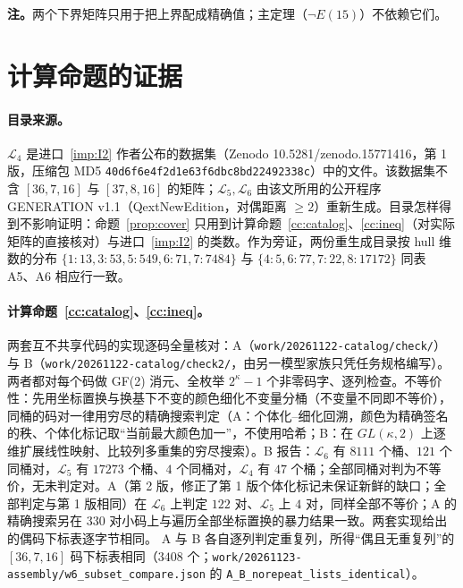 \documentclass[11pt]{ctexart}
\theoremstyle{definition}
\begin{document}
\noindent\textbf{注。}两个下界矩阵只用于把上界配成精确值；主定理（$\neg E(15)$）不依赖它们。

\section{计算命题的证据}\label{sec:evidence}

\paragraph{目录来源。}$\mathcal L_4$ 是进口~\ref{imp:I2} 作者公布的数据集（Zenodo 10.5281/zenodo.15771416，第 1 版，压缩包 MD5 \texttt{40d6f6e4f2d1e63f6dbc8bd22492338c}）中的文件。该数据集不含 $[36,7,16]$ 与 $[37,8,16]$ 的矩阵；$\mathcal L_5,\mathcal L_6$ 由该文所用的公开程序 GENERATION v1.1（QextNewEdition，对偶距离 $\ge2$）重新生成。目录怎样得到不影响证明：命题~\ref{prop:cover} 只用到计算命题~\ref{cc:catalog}、\ref{cc:ineq}（对实际矩阵的直接核对）与进口~\ref{imp:I2} 的类数。作为旁证，两份重生成目录按 hull 维数的分布 $\{1{:}13,3{:}53,5{:}549,6{:}71,7{:}7484\}$ 与 $\{4{:}5,6{:}77,7{:}22,8{:}17172\}$ 同表 A5、A6 相应行一致。

\paragraph{计算命题~\ref{cc:catalog}、\ref{cc:ineq}。}两套互不共享代码的实现逐码全量核对：A（\texttt{work/20261122-catalog/check/}）与 B（\texttt{work/20261122-catalog/check2/}，由另一模型家族只凭任务规格编写）。两者都对每个码做 GF(2) 消元、全枚举 $2^\kappa-1$ 个非零码字、逐列检查。不等价性：先用坐标置换与换基下不变的颜色细化不变量分桶（不变量不同即不等价），同桶的码对一律用穷尽的精确搜索判定（A：个体化--细化回溯，颜色为精确签名的秩、个体化标记取“当前最大颜色加一”，不使用哈希；B：在 $GL(\kappa,2)$ 上逐维扩展线性映射、比较列多重集的穷尽搜索）。B 报告：$\mathcal L_6$ 有 $8111$ 个桶、$121$ 个同桶对，$\mathcal L_5$ 有 $17273$ 个桶、$4$ 个同桶对，$\mathcal L_4$ 有 $47$ 个桶；全部同桶对判为不等价，无未判定对。A（第 2 版，修正了第 1 版个体化标记未保证新鲜的缺口；全部判定与第 1 版相同）在 $\mathcal L_6$ 上判定 $122$ 对、$\mathcal L_5$ 上 $4$ 对，同样全部不等价；A 的精确搜索另在 $330$ 对小码上与遍历全部坐标置换的暴力结果一致。两套实现给出的偶码下标表逐字节相同。
A 与 B 各自逐列判定重复列，所得“偶且无重复列”的 $[36,7,16]$ 码下标表相同（$3408$ 个；\texttt{work/20261123-assembly/w6\_subset\_compare.json} 的 \texttt{A\_B\_norepeat\_lists\_identical}）。
\end{document}
